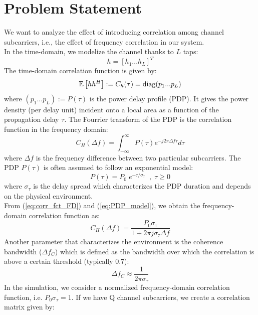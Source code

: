 \documentclass[12pt]{article}
\begin{document}
\section{Problem Statement}
We want to analyze the effect of introducing correlation among channel subcarriers, i.e., the effect of frequency correlation in our system. \\
In the time-domain, we modelize the channel thanks to $L$ taps:
\begin{equation}
	h = [h_1 ... h_L]^T
	\label{eq:channel_TD}
\end{equation}
The time-domain correlation function is given by:
\begin{equation}
	\mathbb{E} \left[h h^H\right] := C_h(\tau) = \text{diag}(p_1 ... p_L)
	\label{eq:corr_fct_TD}
\end{equation}
where $(p_1 ... p_L) := P(\tau)$ is the power delay profile (PDP). It gives the power density (per delay unit) incident onto a local area as a function of the propagation delay $\tau$. The Fourrier transform of the PDP is the correlation function in the frequency domain:
\begin{equation}
 C_H(\Delta f) = \int_{-\infty}^{\infty} P(\tau) e^{-j 2\pi \Delta f \tau} d\tau
\label{eq:corr_fct_FD}
\end{equation}
where $\Delta f$ is the frequency difference between two particular subcarriers. The PDP $P(\tau)$ is often assumed to follow an exponential model:
\begin{equation}
	P(\tau) = P_0 \; e^{-\tau/\sigma_\tau}  \; \; , \; \tau \geq 0
	\label{eq:PDP_model}
\end{equation}
where $\sigma_\tau$ is the delay spread which characterizes the PDP duration and depends on the physical environment.\\
From (\ref{eq:corr_fct_FD}) and (\ref{eq:PDP_model}), we obtain the frequency-domain correlation function as:
\begin{equation}
	C_H(\Delta f) = \frac{P_0 \sigma_\tau}{1+ 2\pi j \sigma_\tau \Delta f}
	\label{eq:correl_fct}
\end{equation}
Another parameter that characterizes the environment is the coherence bandwidth ($\Delta f_C$) which is defined as the bandwidth over which the correlation is above a certain threshold (typically 0.7):
\begin{equation}
	\Delta f_C \approx \frac{1}{2\pi\sigma_\tau}
	\label{eq:coherence_bw}
\end{equation}
In the simulation, we consider a normalized frequency-domain correlation function, i.e. $P_0 \sigma_\tau = 1$. If we have Q channel subcarriers, we create a correlation matrix given by:
\end{document}
